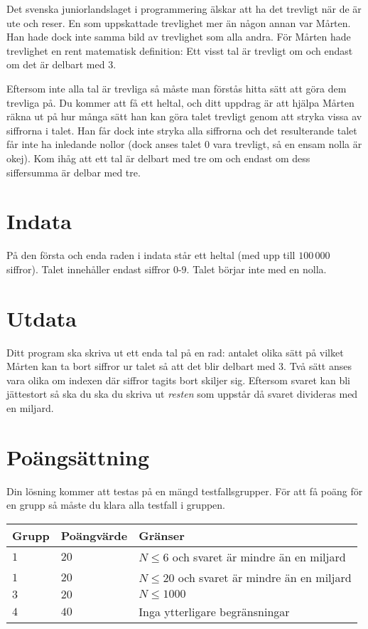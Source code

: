 Det svenska juniorlandslaget i programmering älskar att ha det trevligt när de
är ute och reser. En som uppskattade trevlighet mer än någon annan var Mårten.
Han hade dock inte samma bild av trevlighet som alla andra. För Mårten hade
trevlighet en rent matematisk definition: Ett visst tal är trevligt om och
endast om det är delbart med 3.

Eftersom inte alla tal är trevliga så måste man förstås hitta sätt att göra dem
trevliga på. Du kommer att få ett heltal, och ditt uppdrag är att hjälpa Mårten
räkna ut på hur många sätt han kan göra talet trevligt genom att stryka vissa av
siffrorna i talet. Han får dock inte stryka alla siffrorna och det resulterande
talet får inte ha inledande nollor (dock anses talet $0$ vara trevligt, så en
ensam nolla är okej). Kom ihåg att ett tal är delbart med tre om
och endast om dess siffersumma är delbar med tre.

\section*{Indata}
På den första och enda raden i indata står ett heltal (med upp till $100\,000$
siffror). Talet innehåller endast siffror $0$-$9$. Talet börjar inte med en nolla.

\section*{Utdata}
Ditt program ska skriva ut ett enda tal på en rad: antalet olika sätt på vilket
Mårten kan ta bort siffror ur talet så att det blir delbart med $3$. Två sätt
anses vara olika om indexen där siffror tagits bort skiljer sig. Eftersom
svaret kan bli jättestort så ska du ska du skriva ut \emph{resten} som uppstår då svaret divideras med en miljard. 


\section*{Poängsättning}
Din lösning kommer att testas på en mängd testfallsgrupper.
För att få poäng för en grupp så måste du klara alla testfall i gruppen.

\noindent
\begin{tabular}{| l | l | l |}
  \hline
  Grupp & Poängvärde & Gränser \\ \hline
  $1$   & $20$       & $N \leq 6$ och svaret är mindre än en miljard \\ \hline
  $1$   & $20$       & $N \leq 20$ och svaret är mindre än en miljard \\ \hline
  $3$   & $20$       & $N \leq 1000$ \\ \hline
  $4$   & $40$       & Inga ytterligare begränsningar \\ \hline
\end{tabular}

